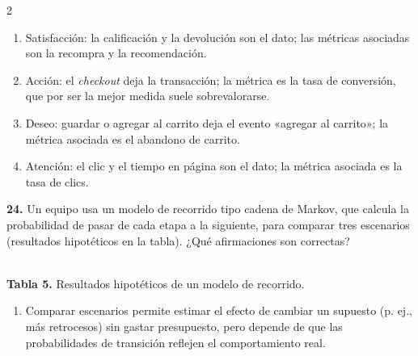\documentclass[10pt,letterpaper]{article}
\newcommand{\cas}{\framebox[1.0em]{\rule{0pt}{1.05ex}}}
\begin{document}
\begin{multicols}{2}
\begin{minipage}[t]{\columnwidth}
\vspace{1pt}\begin{enumerate}[label=\cas\ \alph*),leftmargin=2.3em,itemsep=1.2pt,topsep=1pt,parsep=0pt,partopsep=0pt]
\item Satisfacción: la calificación y la devolución son el dato; las métricas asociadas son la recompra y la recomendación.
\item Acción: el \textit{checkout} deja la transacción; la métrica es la tasa de conversión, que por ser la mejor medida suele sobrevalorarse.
\item Deseo: guardar o agregar al carrito deja el evento «agregar al carrito»; la métrica asociada es el abandono de carrito.
\item Atención: el clic y el tiempo en página son el dato; la métrica asociada es la tasa de clics.
\end{enumerate}\end{minipage}\par\vspace{3pt}
\begin{minipage}[t]{\columnwidth}\noindent\textbf{24.} Un equipo usa un modelo de recorrido tipo cadena de Markov, que calcula la probabilidad de pasar de cada etapa a la siguiente, para comparar tres escenarios (resultados hipotéticos en la tabla). ¿Qué afirmaciones son correctas?
\begin{center}\\[1pt]{\tiny\textbf{Tabla 5.} Resultados hipotéticos de un modelo de recorrido.}\end{center}
\vspace{1pt}\begin{enumerate}[label=\cas\ \alph*),leftmargin=2.3em,itemsep=1.2pt,topsep=1pt,parsep=0pt,partopsep=0pt]
\item Comparar escenarios permite estimar el efecto de cambiar un supuesto (p. ej., más retrocesos) sin gastar presupuesto, pero depende de que las probabilidades de transición reflejen el comportamiento real.

\end{enumerate}
\end{minipage}
\end{multicols}
\end{document}

